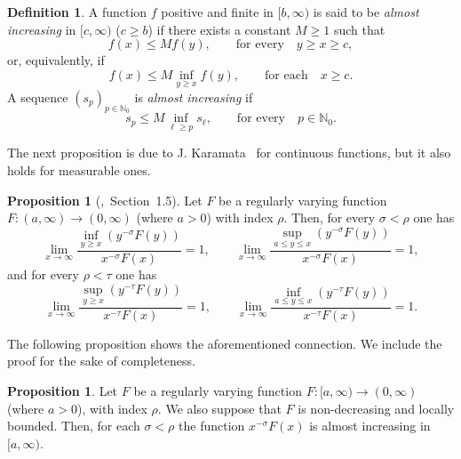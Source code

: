 \documentclass[11pt,a4paper]{article}
\theoremstyle{definition}
\newtheorem{pro}[theo]{Proposition}
\newtheorem{defi}[theo]{Definition}
\newenvironment{den}{\smallskip\begin{defi}}{\end{defi}\smallskip}
\def\oo{\infty}
\def\ri{\rightarrow}
\def\ro{\rho}
\def\N{\mathbb{N}}
\def\no{\nonumber}
\begin{document}
\begin{den}
A function $f$ positive and finite in $[b,\oo)$ is said to be \textit{almost increasing} in $[c,\oo)$ ($c\geq b$) if there
exists a constant $M\geq1$ such that
\begin{equation}
 f(x)\leq M f(y), \qquad \text{for every} \quad y\geq x \geq c,\no
\end{equation}
or, equivalently, if
\begin{equation*}
 f(x)\leq M \inf_{y\geq x} f(y), \qquad \text{for each} \quad x \geq c.
\end{equation*}
A sequence $(s_p)_{p\in\N_0}$ is \textit{almost increasing} if
\begin{equation}
s_p\leq M \inf_{\ell\geq p} s_{\ell}, \qquad \text{for every} \quad p \in \N_0.\no
\end{equation}
\end{den}


The next proposition is due to J. Karamata~\cite{karamata1,karamata2} for continuous functions, but it also holds for measurable ones.

\begin{pro}[\cite{seneta},\ Section\ 1.5]\label{propKaramataRV}
Let $F$ be a regularly varying function $F:(a,\oo)\ri(0,\oo)$ (where $a>0$) with index $\ro$. Then, for every $\sigma<\ro$ one has
$$\lim_{x\ri\oo} \frac{\inf_{y\geq x} (y^{-\sigma} F(y))}{ x^{-\sigma} F(x)} =1,
\qquad \lim_{x\ri\oo} \frac{\sup_{a\leq y\leq x} (y^{-\sigma} F(y))}{ x^{-\sigma} F(x)} =1,  $$
and for every $\ro<\tau$ one has
$$\lim_{x\ri\oo} \frac{\sup_{y\geq x} (y^{-\tau} F(y))}{ x^{-\tau} F(x)} =1,
\qquad \lim_{x\ri\oo} \frac{\inf_{a\leq y\leq x} (y^{-\tau} F(y))}{ x^{-\tau} F(x)} =1. $$
\end{pro}



The following proposition shows the aforementioned connection. We include the proof for the sake of completeness.%

\begin{pro}\label{pro.RV.implica.almostincreasing}
Let $F$ be a regularly varying function $F:[a,\oo)\ri(0,\oo)$ (where $a>0$), with index $\ro$. We also suppose that $F$ is non-decreasing and
locally bounded. Then, for each $\sigma<\ro$ the function
$x^{-\sigma}F(x)$ is almost increasing in $[a,\oo)$.
\end{pro}
\end{document}
